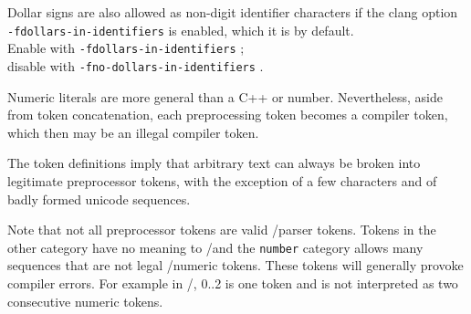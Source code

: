 Dollar signs are also allowed as non-digit identifier characters if the clang option\\ \texttt{-fdollars-in-identifiers} is enabled, which it is by default. \\
Enable with \texttt{-fdollars-in-identifiers} ; \\disable with \texttt{-fno-dollars-in-identifiers} .

Numeric literals are more general than a C++ or \acsl number. 
Nevertheless, aside from token concatenation, each preprocessing token
becomes a compiler token, which then may be an illegal compiler token.

The token definitions imply that arbitrary text can always be broken into
legitimate preprocessor tokens, with the exception of a few characters and of badly formed unicode sequences.

Note that not all preprocessor tokens are valid \C/\cpp parser tokens. Tokens in the other category have no meaning to \C/\cpp and the \texttt{number} category allows many sequences that are not legal \C/\cpp numeric tokens. These tokens will generally provoke compiler errors. For example in \C/\cpp, 0..2 is one token and is not interpreted as two consecutive numeric tokens.


